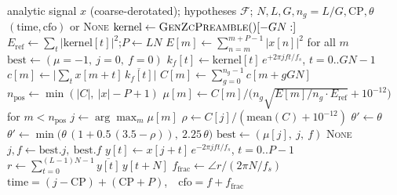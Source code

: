 \begin{algorithm}[H]
\caption{Float ZC detector (\texttt{OFDMModem.detect\_zc\_preamble}), as implemented.}
\label{lst:zc_float}
\begin{algorithmic}[1]
\Require analytic signal $x$ (coarse-derotated); hypotheses $\mathcal{F}$; $N, L, G, n_g{=}L/G, \mathrm{CP}, \theta$
\Ensure $(\text{time}, \text{cfo})$ or \textsc{None}
\State $\mathrm{kernel} \gets \textsc{GenZcPreamble}()[-GN:]$ 
\State $E_{\mathrm{ref}} \gets \sum_t |\mathrm{kernel}[t]|^2$;\quad $P \gets L N$ 
\State $E[m] \gets \sum_{n=m}^{m+P-1} |x[n]|^2$ for all $m$ 
\State $\mathrm{best} \gets (\mu{=}-1,\ j{=}0,\ f{=}0)$
    \State $k_f[t] \gets \mathrm{kernel}[t]\, e^{+2\pi j f t/f_s}$, $t = 0..GN{-}1$ 
    \State $c[m] \gets \big|\sum_t x[m{+}t]\,\overline{k_f[t]}\big|$ 
    \State $C[m] \gets \sum_{g=0}^{n_g-1} c[m + gGN]$ 
    \State $n_{\mathrm{pos}} \gets \min(|C|,\ |x| - P + 1)$
    \State $\mu[m] \gets C[m] \big/ \big(n_g \sqrt{E[m]/n_g \cdot E_{\mathrm{ref}}} + 10^{-12}\big)$ for $m < n_{\mathrm{pos}}$ \Comment{$\in [0,1]$}
    \State $j \gets \arg\max_m \mu[m]$
    \State $\rho \gets C[j] / (\mathrm{mean}(C) + 10^{-12})$ 
    \State $\theta' \gets \theta$
     $\theta' \gets \min\big(\theta\,(1 + 0.5\,(3.5 - \rho)),\ 2.25\,\theta\big)$  \EndIf
     $\mathrm{best} \gets (\mu[j],\ j,\ f)$ \EndIf
\EndFor
{} \Return \textsc{None} \EndIf
\State $j, f \gets \mathrm{best}.j,\ \mathrm{best}.f$
\State $y[t] \gets x[j{+}t]\, e^{-2\pi j f t/f_s}$, $t = 0..P{-}1$ 
\State $r \gets \sum_{t=0}^{(L-1)N-1} \overline{y[t]}\, y[t{+}N]$ 
\State $f_{\mathrm{frac}} \gets \angle r \big/ (2\pi N/f_s)$ 
\State \Return $\text{time} = (j - \mathrm{CP}) + (\mathrm{CP} + P)$,\ \ $\text{cfo} = f + f_{\mathrm{frac}}$ 
\end{algorithmic}
\end{algorithm}

